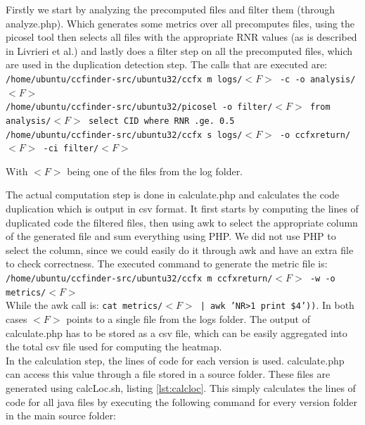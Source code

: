 \documentclass[a4paper,twoside,11pt]{article}
\begin{document}
Firstly we start by analyzing the precomputed files and filter them (through {\sc analyze.php}). Which generates some metrics over all precomputes files, using the {\sc picosel} tool then selects all files with the appropriate RNR values (as is described in Livrieri et al.) and lastly does a filter step on all the precomputed files, which are used in the duplication detection step. The calls that are executed are: \\

\noindent\texttt{/home/ubuntu/ccfinder-src/ubuntu32/ccfx m logs/$<F>$ -c -o analysis/$<F>$ \\
/home/ubuntu/ccfinder-src/ubuntu32/picosel -o filter/$<F>$ from analysis/$<F>$ select CID where RNR .ge. 0.5 \\
/home/ubuntu/ccfinder-src/ubuntu32/ccfx s logs/$<F>$ -o ccfxreturn/$<F>$ -ci filter/$<F>$ \\}

With $<F>$ being one of the files from the log folder.

The actual computation step is done in {\sc calculate.php} and calculates the code duplication which is output in csv format. It first starts by computing the lines of duplicated code the filtered files, then using {\sc awk} to select the appropriate column of the generated file and sum everything using PHP. We did not use PHP to select the column, since we could easily do it through {\sc awk} and have an extra file to check correctness. The executed command to generate the metric file is: \\

\noindent\texttt{/home/ubuntu/ccfinder-src/ubuntu32/ccfx m ccfxreturn/$<F>$ -w -o metrics/$<F>$} \\

While the {\sc awk} call is: \texttt{cat metrics/$<F>$ | awk 'NR>1 {print \$4}'))}. In both cases $<F>$ points to a single file from the logs folder. The output of {\sc calculate.php} has to be stored as a csv file, which can be easily aggregated into the total csv file used for computing the heatmap.\\

In the calculation step, the lines of code for each version is used. {\sc calculate.php} can access this value through a file stored in a source folder. These files are generated using {\sc calcLoc.sh}, listing \ref{lst:calcloc}. This simply calculates the lines of code for all java files by executing the following command for every version folder in the main source folder: \\
\end{document}
